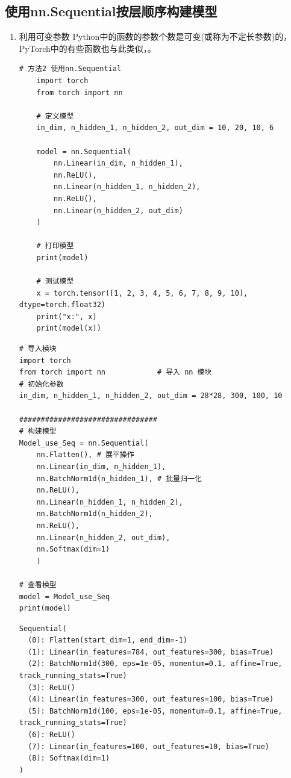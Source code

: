 \subsection{使用nn.Sequential按层顺序构建模型}
\label{subsubsec:Pytorch_build_model_with_nn_Sequential}
\begin{enumerate}[label=\arabic*)]
    \item 利用可变参数
    Python中的函数的参数个数是可变(或称为不定长参数)的，
    PyTorch中的有些函数也与此类似，。
    \begin{lstlisting}[style=pythonstyle]
    # 方法2 使用nn.Sequential
    import torch
    from torch import nn

    # 定义模型
    in_dim, n_hidden_1, n_hidden_2, out_dim = 10, 20, 10, 6

    model = nn.Sequential(
        nn.Linear(in_dim, n_hidden_1),
        nn.ReLU(),
        nn.Linear(n_hidden_1, n_hidden_2),
        nn.ReLU(),
        nn.Linear(n_hidden_2, out_dim)
    )

    # 打印模型
    print(model)

    # 测试模型
    x = torch.tensor([1, 2, 3, 4, 5, 6, 7, 8, 9, 10], dtype=torch.float32)
    print("x:", x)
    print(model(x))
    \end{lstlisting}

\begin{lstlisting}[style=pythonstyle]
# 导入模块
import torch
from torch import nn            # 导入 nn 模块
# 初始化参数
in_dim, n_hidden_1, n_hidden_2, out_dim = 28*28, 300, 100, 10

################################
# 构建模型
Model_use_Seq = nn.Sequential(
    nn.Flatten(), # 展平操作
    nn.Linear(in_dim, n_hidden_1),
    nn.BatchNorm1d(n_hidden_1), # 批量归一化
    nn.ReLU(),
    nn.Linear(n_hidden_1, n_hidden_2),
    nn.BatchNorm1d(n_hidden_2),
    nn.ReLU(),
    nn.Linear(n_hidden_2, out_dim),
    nn.Softmax(dim=1)
    )

# 查看模型
model = Model_use_Seq
print(model)
\end{lstlisting}
\begin{lstlisting}[style=demostyle,numbers=none]
Sequential(
  (0): Flatten(start_dim=1, end_dim=-1)
  (1): Linear(in_features=784, out_features=300, bias=True)
  (2): BatchNorm1d(300, eps=1e-05, momentum=0.1, affine=True, track_running_stats=True)
  (3): ReLU()
  (4): Linear(in_features=300, out_features=100, bias=True)
  (5): BatchNorm1d(100, eps=1e-05, momentum=0.1, affine=True, track_running_stats=True)
  (6): ReLU()
  (7): Linear(in_features=100, out_features=10, bias=True)
  (8): Softmax(dim=1)
)
\end{lstlisting}   
    

\end{enumerate}
